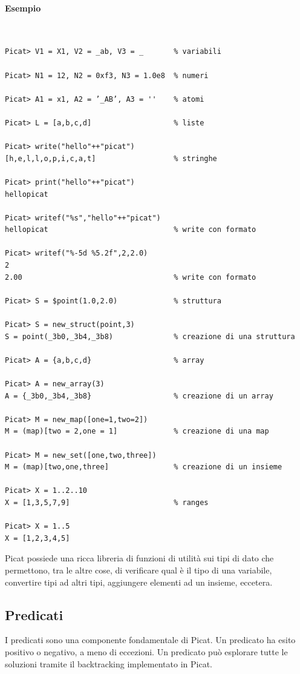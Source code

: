 \documentclass[12pt,a4paper,openright]{book} %
\begin{document}
\paragraph{Esempio}\
\begin{verbatim}
Picat> V1 = X1, V2 = _ab, V3 = _       % variabili

Picat> N1 = 12, N2 = 0xf3, N3 = 1.0e8  % numeri

Picat> A1 = x1, A2 = ’_AB’, A3 = ''    % atomi

Picat> L = [a,b,c,d]                   % liste

Picat> write("hello"++"picat")
[h,e,l,l,o,p,i,c,a,t]                  % stringhe

Picat> print("hello"++"picat")
hellopicat

Picat> writef("%s","hello"++"picat")
hellopicat                             % write con formato

Picat> writef("%-5d %5.2f",2,2.0)
2
2.00                                   % write con formato

Picat> S = $point(1.0,2.0)             % struttura

Picat> S = new_struct(point,3)
S = point(_3b0,_3b4,_3b8)              % creazione di una struttura

Picat> A = {a,b,c,d}                   % array

Picat> A = new_array(3)
A = {_3b0,_3b4,_3b8}                   % creazione di un array

Picat> M = new_map([one=1,two=2])
M = (map)[two = 2,one = 1]             % creazione di una map

Picat> M = new_set([one,two,three])
M = (map)[two,one,three]               % creazione di un insieme

Picat> X = 1..2..10
X = [1,3,5,7,9]                        % ranges

Picat> X = 1..5
X = [1,2,3,4,5]
\end{verbatim}

Picat possiede una ricca libreria di funzioni di utilità sui tipi di dato che permettono, tra le altre cose, di verificare qual è il tipo di una variabile, convertire tipi ad altri tipi, aggiungere elementi ad un insieme, eccetera.

\subsection{Predicati}
\label{sec:picat_base_pred}

I predicati sono una componente fondamentale di Picat. Un predicato ha esito positivo o negativo, a meno di eccezioni. Un predicato può esplorare tutte le soluzioni tramite il backtracking implementato in Picat.
\end{document}
